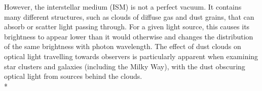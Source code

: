 \documentclass[12pt, a4paper]{report}
\begin{document}
However, the interstellar medium (ISM) is not a perfect vacuum. It contains many different structures, such as clouds of diffuse gas and dust grains, that can absorb or scatter light passing through. For a given light source, this causes its brightness to appear lower than it would otherwise and changes the distribution of the same brightness with photon wavelength. The effect of dust clouds on optical light travelling towards observers is particularly apparent when examining star clusters and galaxies (including the Milky Way), with the dust obscuring optical light from sources behind the clouds. \\*





\end{document}
